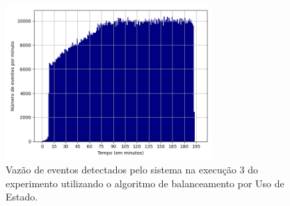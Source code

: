 





\begin{figure}[h]
\centering
\includegraphics[width=0.7\textwidth]{figuras/graphics/histogram_vazao_8-dez-su.png}
\caption{Vazão de eventos detectados pelo sistema na execução 3 do experimento utilizando o algoritmo de balanceamento por Uso de Estado.}
\label{fig:vazao_8-dez-su}
\end{figure}



